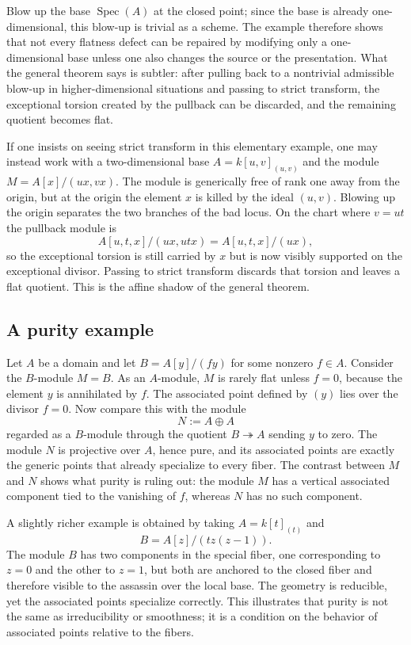\documentclass[11pt,oneside]{article}
\newcommand{\Spec}{\operatorname{Spec}}
\begin{document}
Blow up the base $\Spec(A)$ at the closed point; since the base is already one-dimensional, this blow-up is trivial as a scheme.  The example therefore shows that not every flatness defect can be repaired by modifying only a one-dimensional base unless one also changes the source or the presentation.  What the general theorem says is subtler: after pulling back to a nontrivial admissible blow-up in higher-dimensional situations and passing to strict transform, the exceptional torsion created by the pullback can be discarded, and the remaining quotient becomes flat.

If one insists on seeing strict transform in this elementary example, one may instead work with a two-dimensional base $A=k[u,v]_{(u,v)}$ and the module $M=A[x]/(ux,vx)$.  The module is generically free of rank one away from the origin, but at the origin the element $x$ is killed by the ideal $(u,v)$.  Blowing up the origin separates the two branches of the bad locus.  On the chart where $v=ut$ the pullback module is
\[
A[u,t,x]/(ux,utx)=A[u,t,x]/(ux),
\]
so the exceptional torsion is still carried by $x$ but is now visibly supported on the exceptional divisor.  Passing to strict transform discards that torsion and leaves a flat quotient.  This is the affine shadow of the general theorem.

\subsection{A purity example}

Let $A$ be a domain and let $B=A[y]/(fy)$ for some nonzero $f\in A$.  Consider the $B$-module $M=B$.  As an $A$-module, $M$ is rarely flat unless $f=0$, because the element $y$ is annihilated by $f$.  The associated point defined by $(y)$ lies over the divisor $f=0$.  Now compare this with the module
\[
N:=A\oplus A
\]
regarded as a $B$-module through the quotient $B\twoheadrightarrow A$ sending $y$ to zero.  The module $N$ is projective over $A$, hence pure, and its associated points are exactly the generic points that already specialize to every fiber.  The contrast between $M$ and $N$ shows what purity is ruling out: the module $M$ has a vertical associated component tied to the vanishing of $f$, whereas $N$ has no such component.

A slightly richer example is obtained by taking $A=k[t]_{(t)}$ and
\[
B=A[z]/(tz(z-1)).
\]
The module $B$ has two components in the special fiber, one corresponding to $z=0$ and the other to $z=1$, but both are anchored to the closed fiber and therefore visible to the assassin over the local base.  The geometry is reducible, yet the associated points specialize correctly.  This illustrates that purity is not the same as irreducibility or smoothness; it is a condition on the behavior of associated points relative to the fibers.
\end{document}
